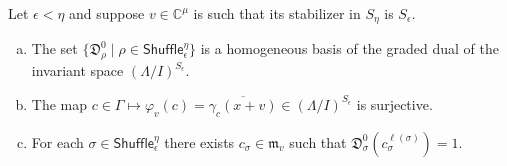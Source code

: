 \documentclass[11pt,fleqn]{article}
\newcommand\CC{\mathbb C}
\newcommand\DD{\mathfrak D}
\renewcommand\phi{\varphi}
\newcommand\m{\mathfrak m}
\newcommand\Shuffle{\mathsf{Shuffle}}
\begin{document}
\begin{Lemma*}
Let $\epsilon < \eta$ and suppose $v \in \CC^\mu$ is such that its stabilizer
in $S_\eta$ is $S_\epsilon$. 
\begin{enumerate}[(a)]
\item The set $\{\DD_\rho^0 \mid \rho \in \Shuffle_\epsilon^\eta\}$ is a 
	homogeneous basis of the graded dual of the invariant space
	$(\Lambda/I)^{S_\epsilon}$.
\item The map $c\in \Gamma \mapsto \phi_v(c)
	= \overline{\gamma_c(x+v)} \in (\Lambda/I)^{S_\epsilon}$ is surjective.
\item For each $\sigma \in \Shuffle_{\epsilon}^\eta$ there exists $c_\sigma \in
\m_v$ such that $\DD_\sigma^0(c_\sigma^{\ell(\sigma)}) = 1$.
\end{enumerate}
\end{Lemma*}
\end{document}
